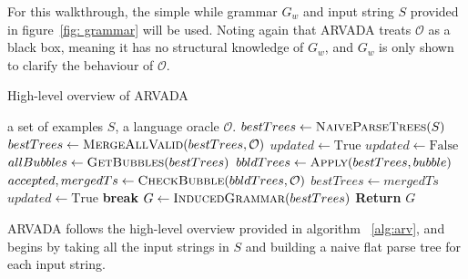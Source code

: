 For this walkthrough, the simple while grammar $G_w$ and input string $S$ provided in figure~\ref{fig: grammar} will be used. Noting again that ARVADA treats $\mathcal{O}$ as a black box, meaning it has no structural knowledge of $G_w$, and $G_w$ is only shown to clarify the behaviour of $\mathcal{O}$.

\begin{algorithm}[H]
\caption{High-level overview of ARVADA \cite{kulkarniLearningHighlyRecursive2021}}\label{alg:arv}
\begin{algorithmic}[1]
    \Require a set of examples $S$, a language oracle $\mathcal{O}$.
    \State $bestTrees \gets \textsc{NaiveParseTrees}(S)$
    \State $bestTrees \gets \textsc{MergeAllValid}(bestTrees, \mathcal{O})$
    \State $updated \gets \text{True}$
        \State $updated \gets \text{False}$
        \State $allBubbles \gets \textsc{GetBubbles}(bestTrees)$
            \State $bbldTrees \gets \textsc{Apply}(bestTrees, bubble)$
            \State $accepted, mergedTs \gets \textsc{CheckBubble}(bbldTrees, \mathcal{O})$
                \State $bestTrees \gets mergedTs$
                \State $updated \gets \text{True}$
                \State \textbf{break}
            \EndIf
        \EndFor
    \EndWhile
    \State $G \gets \textsc{InducedGrammar}(bestTrees)$
    \State \textbf{Return} $G$
\end{algorithmic}
\end{algorithm}

ARVADA follows the high-level overview provided in algorithm ~\ref{alg:arv}, and begins by taking all the input strings in $S$ and building a naive flat parse tree for each input string.

